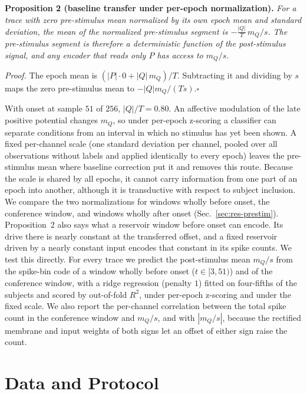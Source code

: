 \documentclass[journal]{IEEEtran}
\begin{document}
\noindent\textbf{Proposition 2 (baseline transfer under per-epoch normalization).} \emph{For a trace with zero pre-stimulus mean normalized by its own epoch mean and standard deviation, the mean of the normalized pre-stimulus segment is $-\tfrac{|Q|}{T}\,m_Q/s$. The pre-stimulus segment is therefore a deterministic function of the post-stimulus signal, and any encoder that reads only $P$ has access to $m_Q/s$.}

\noindent\emph{Proof.} The epoch mean is $(|P|\cdot 0+|Q|\,m_Q)/T$. Subtracting it and dividing by $s$ maps the zero pre-stimulus mean to $-|Q|m_Q/(Ts)$.\hfill$\square$

With onset at sample $51$ of $256$, $|Q|/T=0.80$. An affective modulation of the late positive potential changes $m_Q$, so under per-epoch z-scoring a classifier can separate conditions from an interval in which no stimulus has yet been shown. A fixed per-channel scale (one standard deviation per channel, pooled over all observations without labels and applied identically to every epoch) leaves the pre-stimulus mean where baseline correction put it and removes this route. Because the scale is shared by all epochs, it cannot carry information from one part of an epoch into another, although it is transductive with respect to subject inclusion. We compare the two normalizations for windows wholly before onset, the conference window, and windows wholly after onset (Sec.~\ref{sec:res-prestim}). Proposition~2 also says what a reservoir window before onset can encode. Its drive there is nearly constant at the transferred offset, and a fixed reservoir driven by a nearly constant input encodes that constant in its spike counts. We test this directly. For every trace we predict the post-stimulus mean $m_Q/s$ from the spike-bin code of a window wholly before onset ($t\in[3,51)$) and of the conference window, with a ridge regression (penalty $1$) fitted on four-fifths of the subjects and scored by out-of-fold $R^2$, under per-epoch z-scoring and under the fixed scale. We also report the per-channel correlation between the total spike count in the conference window and $m_Q/s$, and with $|m_Q/s|$, because the rectified membrane and input weights of both signs let an offset of either sign raise the count.

\section{Data and Protocol}
\label{sec:data}
\end{document}
